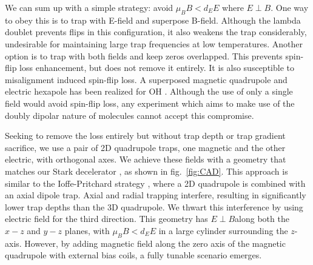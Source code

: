 \documentclass[%
 reprint,
groupedaddress,
 amsmath,amssymb,
 aps,
prl,
]{revtex4-1}
\newcommand{\epb}{$E\!\perp\!B$}
\begin{document}
We can sum up with a simple strategy: avoid $\mu_BB < d_EE$ where \epb. One way to obey this is to trap with E-field and superpose B-field. Although the lambda doublet prevents flips in this configuration, it also weakens the trap considerably, undesirable for maintaining large trap frequencies at low temperatures. Another option is to trap with both fields and keep zeros overlapped. This prevents spin-flip loss enhancement, but does not remove it entirely. It is also susceptible to misalignment induced spin-flip loss. A superposed magnetic quadrupole and electric hexapole has been realized for OH \cite{Sawyer2007}. Although the use of only a single field would avoid spin-flip loss, any experiment which aims to make use of the doubly dipolar nature of molecules cannot accept this compromise.

Seeking to remove the loss entirely but without trap depth or trap gradient sacrifice, we use a pair of 2D quadrupole traps, one magnetic and the other electric, with orthogonal axes. We achieve these fields with a geometry that matches our Stark decelerator \cite{Bochinski2003}, as shown in fig.~\ref{fig:CAD}. This approach is similar to the Ioffe-Pritchard strategy \cite{pritchard1983}, where a 2D quadrupole is combined with an axial dipole trap. Axial and radial trapping interfere, resulting in significantly lower trap depths than the 3D quadrupole. We thwart this interference by using electric field for the third direction. This geometry has \epb along both the $x-z$ and $y-z$ planes, with $\mu_BB < d_EE$ in a large cylinder surrounding the $z$-axis. However, by adding magnetic field along the zero axis of the magnetic quadrupole with external bias coils, a fully tunable scenario emerges. %

\end{document}
